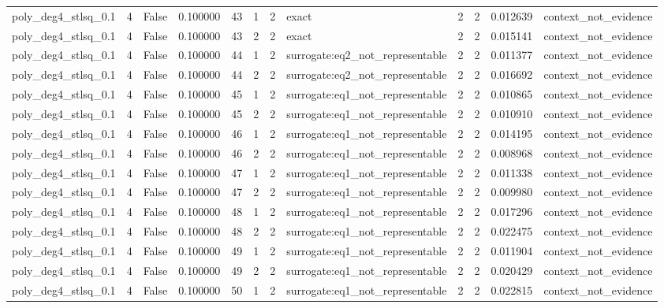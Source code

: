 \begin{tabular}{lrrrrrrlrrrl}
poly\_deg4\_stlsq\_0.1 & 4 & False & 0.100000 & 43 & 1 & 2 & exact & 2 & 2 & 0.012639 & context\_not\_evidence \\
poly\_deg4\_stlsq\_0.1 & 4 & False & 0.100000 & 43 & 2 & 2 & exact & 2 & 2 & 0.015141 & context\_not\_evidence \\
poly\_deg4\_stlsq\_0.1 & 4 & False & 0.100000 & 44 & 1 & 2 & surrogate:eq2\_not\_representable & 2 & 2 & 0.011377 & context\_not\_evidence \\
poly\_deg4\_stlsq\_0.1 & 4 & False & 0.100000 & 44 & 2 & 2 & surrogate:eq2\_not\_representable & 2 & 2 & 0.016692 & context\_not\_evidence \\
poly\_deg4\_stlsq\_0.1 & 4 & False & 0.100000 & 45 & 1 & 2 & surrogate:eq1\_not\_representable & 2 & 2 & 0.010865 & context\_not\_evidence \\
poly\_deg4\_stlsq\_0.1 & 4 & False & 0.100000 & 45 & 2 & 2 & surrogate:eq1\_not\_representable & 2 & 2 & 0.010910 & context\_not\_evidence \\
poly\_deg4\_stlsq\_0.1 & 4 & False & 0.100000 & 46 & 1 & 2 & surrogate:eq1\_not\_representable & 2 & 2 & 0.014195 & context\_not\_evidence \\
poly\_deg4\_stlsq\_0.1 & 4 & False & 0.100000 & 46 & 2 & 2 & surrogate:eq1\_not\_representable & 2 & 2 & 0.008968 & context\_not\_evidence \\
poly\_deg4\_stlsq\_0.1 & 4 & False & 0.100000 & 47 & 1 & 2 & surrogate:eq1\_not\_representable & 2 & 2 & 0.011338 & context\_not\_evidence \\
poly\_deg4\_stlsq\_0.1 & 4 & False & 0.100000 & 47 & 2 & 2 & surrogate:eq1\_not\_representable & 2 & 2 & 0.009980 & context\_not\_evidence \\
poly\_deg4\_stlsq\_0.1 & 4 & False & 0.100000 & 48 & 1 & 2 & surrogate:eq1\_not\_representable & 2 & 2 & 0.017296 & context\_not\_evidence \\
poly\_deg4\_stlsq\_0.1 & 4 & False & 0.100000 & 48 & 2 & 2 & surrogate:eq1\_not\_representable & 2 & 2 & 0.022475 & context\_not\_evidence \\
poly\_deg4\_stlsq\_0.1 & 4 & False & 0.100000 & 49 & 1 & 2 & surrogate:eq1\_not\_representable & 2 & 2 & 0.011904 & context\_not\_evidence \\
poly\_deg4\_stlsq\_0.1 & 4 & False & 0.100000 & 49 & 2 & 2 & surrogate:eq1\_not\_representable & 2 & 2 & 0.020429 & context\_not\_evidence \\
poly\_deg4\_stlsq\_0.1 & 4 & False & 0.100000 & 50 & 1 & 2 & surrogate:eq1\_not\_representable & 2 & 2 & 0.022815 & context\_not\_evidence \\

\end{tabular}
